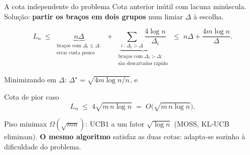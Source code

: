 \documentclass[aspectratio=169, 10pt]{beamer}
\newcommand{\gap}{\Delta}
\newcommand{\Reg}{L}
\begin{document}
\begin{frame}{A cota independente do problema}
  Cota anterior inútil com lacuna minúscula. Solução: \textbf{partir os
  braços em dois grupos} num limiar $\gap$ à escolha.
  \vspace{-0.3em}

  \vspace{-4mm}
  \[
    \Reg_n \;\le\;
      \underbrace{n\gap}_{\substack{\text{braços com } \gap_i \le \gap:\\ \text{errar custa pouco}}}
      \;+\;
      \underbrace{\sum_{i \,:\, \gap_i > \gap} \frac{4\log n}{\gap_i}}_{\substack{\text{braços com } \gap_i > \gap:\\ \text{são descartados rápido}}}
      \;\le\; n\gap + \frac{4m\log n}{\gap}.
  \]

  \vspace{-0.5em}
  Minimizando em $\gap$: $\gap^{\star} = \sqrt{4m\log n / n}$, e

  \vspace{-3mm}
  \begin{teobox}{Cota de pior caso}
    \[
      \Reg_n \;\le\; 4\sqrt{m\,n\log n} \;=\; O\bigl(\sqrt{m\,n\log n}\bigr).
    \]
  \end{teobox}

  \begin{ideiabox}
    Piso minimax $\Omega(\sqrt{m n})$: UCB1 a um fator $\sqrt{\log n}$
    (MOSS, KL-UCB eliminam). \textbf{O mesmo algoritmo} satisfaz as duas
    cotas: adapta-se sozinho à dificuldade do problema.
  \end{ideiabox}
\end{frame}
\end{document}
